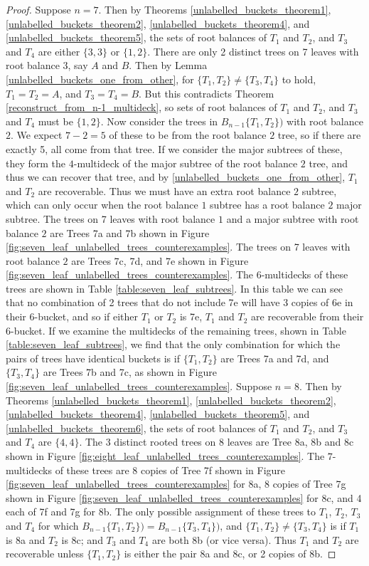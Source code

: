 \documentclass[12pt]{article}
\theoremstyle{definition}
\begin{document}
\begin{proof}
    Suppose $n=7$. Then by Theorems \ref{unlabelled_buckets_theorem1}, \ref{unlabelled_buckets_theorem2}, \ref{unlabelled_buckets_theorem4}, and \ref{unlabelled_buckets_theorem5}, the sets of root balances of $T_1$ and $T_2$, and $T_3$ and $T_4$ are either $\{3, 3\}$ or $\{1, 2\}$. There are only 2 distinct trees on 7 leaves with root balance $3$, say $A$ and $B$. Then by Lemma \ref{unlabelled_buckets_one_from_other}, for $\{T_1, T_2\} \neq \{T_3, T_4\}$ to hold, $T_1 = T_2 = A$, and $T_3 = T_4 = B$. But this contradicts Theorem \ref{reconstruct_from_n-1_multideck}, so sets of root balances of $T_1$ and $T_2$, and $T_3$ and $T_4$ must be $\{1, 2\}$. Now consider the trees in $B_{n-1}\{T_1, T_2\})$ with root balance $2$. We expect $7-2=5$ of these to be from the root balance $2$ tree, so if there are exactly 5, all come from that tree. If we consider the major subtrees of these, they form the $4$-multideck of the major subtree of the root balance $2$ tree, and thus we can recover that tree, and by \ref{unlabelled_buckets_one_from_other}, $T_1$ and $T_2$ are recoverable. Thus we must have an extra root balance $2$ subtree, which can only occur when the root balance $1$ subtree has a root balance $2$ major subtree. The trees on 7 leaves with root balance $1$ and a major subtree with root balance $2$ are Trees 7a and 7b shown in Figure \ref{fig:seven_leaf_unlabelled_trees_counterexamples}. The trees on 7 leaves with root balance $2$ are Trees 7c, 7d, and 7e shown in Figure \ref{fig:seven_leaf_unlabelled_trees_counterexamples}. The 6-multidecks of these trees are shown in Table \ref{table:seven_leaf_subtrees}. In this table we can see that no combination of 2 trees that do not include 7e will have 3 copies of 6e in their 6-bucket, and so if either $T_1$ or $T_2$ is 7e, $T_1$ and $T_2$ are recoverable from their 6-bucket. If we examine the multidecks of the remaining trees, shown in Table \ref{table:seven_leaf_subtrees}, we find that the only combination for which the pairs of trees have identical buckets is if $\{T_1, T_2\}$ are Trees 7a and 7d, and $\{T_3, T_4\}$ are Trees 7b and 7c, as shown in Figure \ref{fig:seven_leaf_unlabelled_trees_counterexamples}.
    Suppose $n=8$. Then by Theorems \ref{unlabelled_buckets_theorem1}, \ref{unlabelled_buckets_theorem2}, \ref{unlabelled_buckets_theorem4}, \ref{unlabelled_buckets_theorem5}, and \ref{unlabelled_buckets_theorem6}, the sets of root balances of $T_1$ and $T_2$, and $T_3$ and $T_4$ are $\{4, 4\}$. The 3 distinct rooted trees on $8$ leaves are Tree 8a, 8b and 8c shown in Figure \ref{fig:eight_leaf_unlabelled_trees_counterexamples}. The $7$-multidecks of these trees are 8 copies of Tree 7f shown in Figure \ref{fig:seven_leaf_unlabelled_trees_counterexamples} for 8a, 8 copies of Tree 7g shown in Figure \ref{fig:seven_leaf_unlabelled_trees_counterexamples} for 8c, and 4 each of 7f and 7g for 8b. The only possible assignment of these trees to $T_1$, $T_2$, $T_3$ and $T_4$ for which $B_{n-1}\{T_1, T_2\}) = B_{n-1}\{T_3, T_4\})$, and $\{T_1, T_2\} \neq \{T_3, T_4\}$ is if $T_1$ is 8a and $T_2$ is 8c; and $T_3$ and $T_4$ are both 8b (or vice versa). Thus $T_1$ and $T_2$ are recoverable unless $\{T_1,T_2\}$ is either the pair 8a and 8c, or 2 copies of 8b.
\end{proof}
\end{document}
